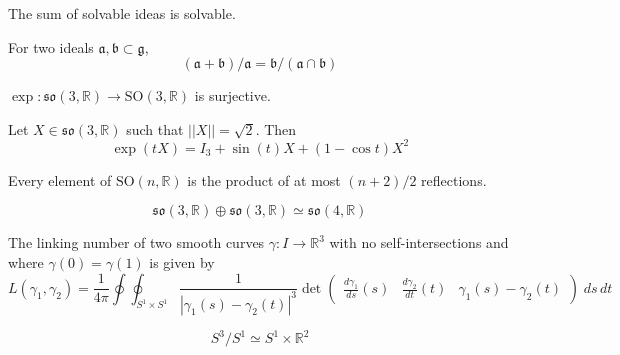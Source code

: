 \documentclass[12pt]{article}
\newcommand{\R}{\mathbb{R}}
\newcommand{\abs}[1]{\left\vert #1 \right\vert}
\newcommand{\norm}[1]{\left\vert \left\vert #1 \right\vert \right\vert}
\newcommand{\SO}{\text{SO}}
\newcommand{\g}{\mathfrak{g}}
\newcommand{\so}{\mathfrak{so}}
\begin{document}
The sum of solvable ideas is solvable. 

For two ideals $\mathfrak{a}, \mathfrak{b} \subset \g$, 
\[(\mathfrak{a} + \mathfrak{b})/\mathfrak{a} = \mathfrak{b}/(\mathfrak{a} \cap \mathfrak{b})\]

$\exp: \so(3, \R) \to \SO(3, \R)$ is surjective. 

Let $X \in \so(3, \R)$ such that $\norm{X} = \sqrt 2$. Then 
\[\exp(tX) = I_3  +\sin(t)X + (1 - \cos t)X^2\]

Every element of $\SO(n, \R)$ is the product of at most $(n+2)/2$ reflections. 

\[\so(3, \R) \oplus \so(3, \R) \simeq \so(4, \R)\]

The linking number of two smooth curves $\gamma: I \to \R^3$ with no self-intersections and where $\gamma(0) = \gamma(1)$ is given by 
\[L(\gamma_1, \gamma_2) = \frac{1}{4\pi} \oint \oint_{S^1 \times S^1} \frac{1}{\abs{\gamma_1(s) - \gamma_2(t)}^3} \det \begin{pmatrix}
    \frac{d\gamma_1}{ds}(s) & \frac{d\gamma_2}{dt}(t) & \gamma_1(s) - \gamma_2(t)
\end{pmatrix}\; ds\, dt\] 

\[S^3/S^1 \simeq S^1 \times \R^2\]
 
\end{document}
